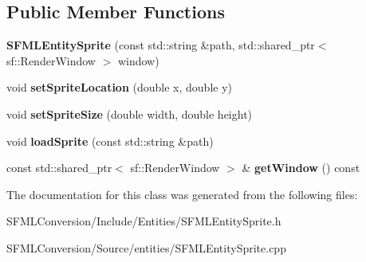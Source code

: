 \subsection*{Public Member Functions}
\begin{DoxyCompactItemize}
\item 
\mbox{\label{classSFMLEntitySprite_a70480096b35a12e360ebb76fc10e958f}} 
{\bfseries S\+F\+M\+L\+Entity\+Sprite} (const std\+::string \&path, std\+::shared\+\_\+ptr$<$ sf\+::\+Render\+Window $>$ window)
\item 
\mbox{\label{classSFMLEntitySprite_af27155ca269dc50239c6ef57d03dedaf}} 
void {\bfseries set\+Sprite\+Location} (double x, double y)
\item 
\mbox{\label{classSFMLEntitySprite_af831d4a79aec4370c15f22f2dc86433e}} 
void {\bfseries set\+Sprite\+Size} (double width, double height)
\item 
\mbox{\label{classSFMLEntitySprite_a65526a721915827363cbfc32c9cf8b61}} 
void {\bfseries load\+Sprite} (const std\+::string \&path)
\item 
\mbox{\label{classSFMLEntitySprite_ac285372cd7a7d8413ccb52c2d0699376}} 
const std\+::shared\+\_\+ptr$<$ sf\+::\+Render\+Window $>$ \& {\bfseries get\+Window} () const
\end{DoxyCompactItemize}


The documentation for this class was generated from the following files\+:\begin{DoxyCompactItemize}
\item 
S\+F\+M\+L\+Conversion/\+Include/\+Entities/S\+F\+M\+L\+Entity\+Sprite.\+h\item 
S\+F\+M\+L\+Conversion/\+Source/entities/S\+F\+M\+L\+Entity\+Sprite.\+cpp\end{DoxyCompactItemize}
